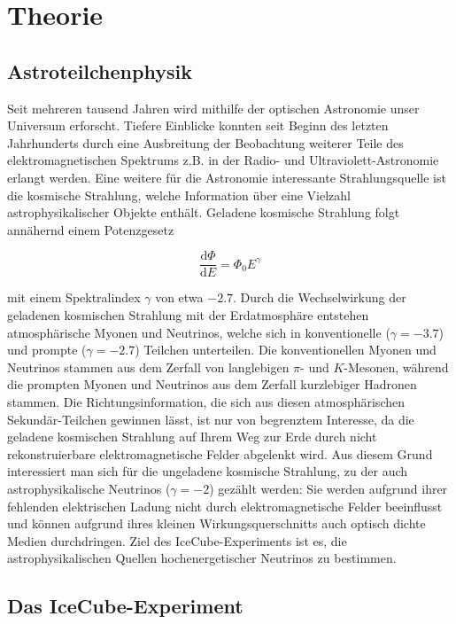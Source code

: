 \section{Theorie}
\label{sec:Theorie}

\subsection{Astroteilchenphysik}

Seit mehreren tausend Jahren wird mithilfe der optischen Astronomie unser Universum erforscht. Tiefere Einblicke konnten seit Beginn des letzten Jahrhunderts durch eine Ausbreitung der Beobachtung weiterer Teile des elektromagnetischen Spektrums z.B. in der Radio- und Ultraviolett-Astronomie erlangt werden. Eine weitere für die Astronomie interessante Strahlungsquelle ist die kosmische Strahlung, welche Information über eine Vielzahl astrophysikalischer Objekte enthält. Geladene kosmische Strahlung folgt annähernd einem Potenzgesetz

\begin{equation}
	\frac{\text{d}\Phi}{\text{d}E} = \Phi_0 E^\gamma
\end{equation}

mit einem Spektralindex $\gamma$ von etwa $-2.7$. Durch die Wechselwirkung der geladenen kosmischen Strahlung mit der Erdatmosphäre entstehen atmosphärische Myonen und Neutrinos, welche sich in konventionelle ($\gamma = -3.7$) und prompte ($\gamma = -2.7$) Teilchen  unterteilen. Die konventionellen Myonen und Neutrinos stammen aus dem Zerfall von langlebigen $\pi$- und $K$-Mesonen, während die prompten Myonen und Neutrinos aus dem Zerfall kurzlebiger Hadronen stammen. Die Richtungsinformation, die sich aus diesen atmosphärischen Sekundär-Teilchen gewinnen lässt, ist nur von begrenztem Interesse, da die geladene kosmischen Strahlung auf Ihrem Weg zur Erde durch nicht rekonstruierbare elektromagnetische Felder abgelenkt wird. Aus diesem Grund interessiert man sich für die ungeladene kosmische Strahlung, zu der auch astrophysikalische Neutrinos ($\gamma = -2$) gezählt werden: Sie werden aufgrund ihrer fehlenden elektrischen Ladung nicht durch elektromagnetische Felder beeinflusst und können aufgrund ihres kleinen Wirkungsquerschnitts auch optisch dichte Medien durchdringen. Ziel des IceCube-Experiments ist es, die astrophysikalischen Quellen hochenergetischer Neutrinos zu bestimmen. 


\subsection{Das IceCube-Experiment}
 
